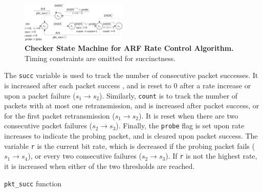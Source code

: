 
\begin{figure}
  \vspace*{-5mm}
  \centering
  \includegraphics[width=0.45\textwidth]{./figures/arf_sm.pdf}
  \caption{\textbf{Checker State Machine for ARF Rate Control Algorithm.} Timing
  constraints are omitted for succinctness.}
  \label{fig:arf_sm}
  \vspace*{-8mm}
\end{figure}


The \texttt{succ} variable is used to track the number of consecutive packet
successes. It is increased after each packet success , and is reset to 0 after a
rate increase or upon a packet failure ($s_1\rightarrow s_2$).  Similarly,
\texttt{count} is to track the number of packets with at most one
retransmission, and is increased after packet success, or for the first packet
retransmission ($s_1\rightarrow s_2$). It is reset when there are two
consecutive packet failures ($s_2\rightarrow s_3$). Finally, the \texttt{probe}
flag is set upon rate increases to indicate the probing packet, and is cleared
upon packet success. The variable \texttt{r} is the current bit rate, which is
decreased if the probing packet fails ($s_1\rightarrow s_4$), or every two
consecutive failures ($s_2\rightarrow s_3$). If \texttt{r} is not the highest
rate, it is increased when either of the two thresholds are reached.


\begin{algorithm}[t!]
  \caption{\texttt{pkt\_succ} function}
  \label{alg:pkt_succ}
  \begin{algorithmic}[1]
    \EndIf
    \EndFunction
  \end{algorithmic}
\end{algorithm}

